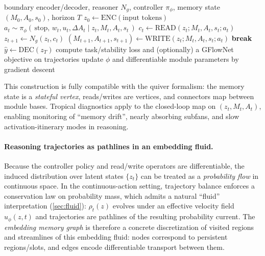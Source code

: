\documentclass[11pt]{article}
\theoremstyle{definition}
\theoremstyle{plain}
\theoremstyle{remark}
\begin{document}
\begin{algorithm}[t]
\caption{Embedding-native GoT memory: differentiable inference and (optional) GFlowNet fine-tuning}
\label{alg:got}
\begin{algorithmic}[1]
\Require boundary encoder/decoder, reasoner $N_g$, controller $\pi_\phi$, memory state $(M_0,A_0,s_0)$, horizon $T$
\State $z_0 \gets \mathrm{ENC}(\text{input tokens})$ 
  \State $a_t \sim \pi_\phi(\,\mathrm{stop},\, w_t,u_t,\Delta A_t \mid z_t, M_t,A_t,s_t\,)$ 
  \State $c_t \gets \mathrm{READ}(z_t; M_t,A_t,s_t; a_t)$ 
  \State $z_{t+1} \gets N_g(z_t, c_t)$ 
  \State $(M_{t+1},A_{t+1},s_{t+1}) \gets \mathrm{WRITE}(z_t; M_t,A_t,s_t; a_t)$
   \textbf{break} \EndIf
\EndFor
\State $\hat y \gets \mathrm{DEC}(z_T)$ 
\State compute task/stability loss and (optionally) a GFlowNet objective on trajectories
\State update $\phi$ and differentiable module parameters by gradient descent
\end{algorithmic}
\end{algorithm}

This construction is fully compatible with the quiver formalism: the memory state is a \emph{stateful vertex}, reads/writes are vertices, and connectors map between module bases.
Tropical diagnostics apply to the closed-loop map on $(z_t,M_t,A_t)$, enabling monitoring of ``memory drift'', nearly absorbing subfans, and slow activation-itinerary modes in reasoning.
\paragraph{Reasoning trajectories as pathlines in an embedding fluid.}
Because the controller policy and read/write operators are differentiable, the induced distribution over latent states $\{z_t\}$ can be treated as a \emph{probability flow} in continuous space.
In the continuous-action setting, trajectory balance enforces a conservation law on probability mass, which admits a natural ``fluid'' interpretation (\cref{sec:fluid}): $\rho_t(z)$ evolves under an effective velocity field $u_\phi(z,t)$ and trajectories are pathlines of the resulting probability current.
The \emph{embedding memory graph} is therefore a concrete discretization of visited regions and streamlines of this embedding fluid: nodes correspond to persistent regions/slots, and edges encode differentiable transport between them.
\end{document}
